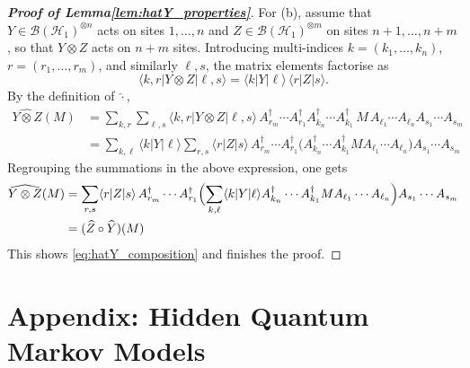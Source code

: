 \documentclass[11pt,a4paper]{article}
\begin{document}
\begin{proof}[\textbf{Proof of Lemma\ref{lem:hatY_properties}}]
For (b), assume that \(Y\in\mathcal{B}(\mathcal{H}_{1})^{\otimes n}\) acts on sites \(1,\dots,n\) and \(Z\in\mathcal{B}(\mathcal{H}_{1})^{\otimes m}\) on sites \(n+1,\dots,n+m\), so that \(Y\otimes Z\) acts on \(n+m\) sites. Introducing multi-indices \(k=(k_1,\dots,k_n)\), \(r=(r_1,\dots,r_m)\), and similarly \(\ell,s\), the matrix elements factorise as
\[
\langle k,r|Y\otimes Z|\ell,s\rangle
=
\langle k|Y|\ell\rangle\,\langle r|Z|s\rangle.
\]
By the definition of \(\widehat{\cdot}\),
\begin{align*}
\widehat{Y\otimes Z}(M)
&=
\sum_{k,r}\sum_{\ell,s}
\langle k,r|Y\otimes Z|\ell,s\rangle\,
A_{r_m}^{\dagger}\cdots A_{r_1}^{\dagger}A_{k_n}^{\dagger}\cdots A_{k_1}^{\dagger}\,
M\,
A_{\ell_1}\cdots A_{\ell_n}A_{s_1}\cdots A_{s_m} \\
&=
\sum_{k,\ell}\langle k|Y|\ell\rangle
\sum_{r,s}\langle r|Z|s\rangle\,
A_{r_m}^{\dagger}\cdots A_{r_1}^{\dagger}
\bigl(A_{k_n}^{\dagger}\cdots A_{k_1}^{\dagger}MA_{\ell_1}\cdots A_{\ell_n}\bigr)
A_{s_1}\cdots A_{s_m}
\end{align*}
Regrouping the summations in the above expression, one gets
\begin{align*}
\widehat{Y\otimes Z}(M)&=
\sum_{r,s}\langle r|Z|s\rangle\,
A_{r_m}^{\dagger}\cdots A_{r_1}^{\dagger}
\Bigl(\sum_{k,\ell}\langle k|Y|\ell\rangle A_{k_n}^{\dagger}\cdots A_{k_1}^{\dagger}MA_{\ell_1}\cdots A_{\ell_n}\Bigr)
A_{s_1}\cdots A_{s_m}\\
&= (\widehat{Z}\circ\widehat{Y})(M)
\end{align*}
 This shows \eqref{eq:hatY_composition} and finishes the proof.
\end{proof}







\section{Appendix: Hidden Quantum Markov Models}\label{app:A}
\end{document}

